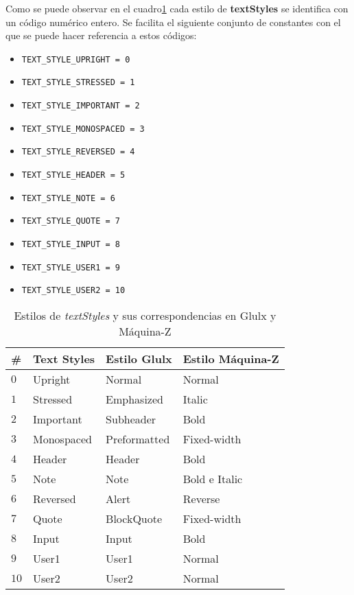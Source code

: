 \documentclass[a4paper,12pt]{article}
\numberwithin{equation}{section}
\begin{document}
Como se puede observar en el cuadro\ref{table:text-styles-estilos-basicos} cada estilo de \textbf{textStyles} se identifica con un código numérico entero. Se facilita el siguiente conjunto de constantes con el que se puede hacer referencia a estos códigos:

\begin{itemize}
	\item \verb|TEXT_STYLE_UPRIGHT = 0|
	\item \verb|TEXT_STYLE_STRESSED = 1|
	\item \verb|TEXT_STYLE_IMPORTANT = 2|
	\item \verb|TEXT_STYLE_MONOSPACED = 3|
	\item \verb|TEXT_STYLE_REVERSED = 4|
	\item \verb|TEXT_STYLE_HEADER = 5|
	\item \verb|TEXT_STYLE_NOTE = 6|
	\item \verb|TEXT_STYLE_QUOTE = 7|
	\item \verb|TEXT_STYLE_INPUT = 8|
	\item \verb|TEXT_STYLE_USER1 = 9|
	\item \verb|TEXT_STYLE_USER2 = 10|
\end{itemize}

\begin{table}[]
\centering
\begin{tabular}{llll}
\hline
\textbf{\#} &\textbf{Text Styles} & \textbf{Estilo Glulx} & \textbf{Estilo Máquina-Z} \\ \hline
$0$		& Upright		& Normal		& Normal		\\
$1$		& Stressed		& Emphasized	& Italic		\\
$2$		& Important		& Subheader		& Bold			\\
$3$		& Monospaced	& Preformatted	& Fixed-width	\\
$4$		& Header		& Header		& Bold			\\
$5$		& Note			& Note			& Bold e Italic	\\
$6$		& Reversed		& Alert			& Reverse		\\
$7$		& Quote			& BlockQuote	& Fixed-width	\\
$8$		& Input			& Input			& Bold			\\
$9$		& User1			& User1			& Normal		\\
$10$	& User2			& User2			& Normal		\\ \hline
\end{tabular}
\caption{Estilos de \emph{textStyles} y sus correspondencias en Glulx y Máquina-Z}
\label{table:text-styles-estilos-basicos}
\end{table}
\end{document}
